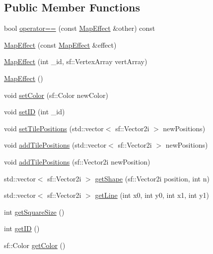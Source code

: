 \subsection*{Public Member Functions}
\begin{DoxyCompactItemize}
\item 
bool \mbox{\hyperlink{class_map_effect_a4782568b5d45629c080fdf183943ea29}{operator==}} (const \mbox{\hyperlink{class_map_effect}{Map\+Effect}} \&other) const
\item 
\mbox{\hyperlink{class_map_effect_aff543fedf91ca1798942f756c8388aa3}{Map\+Effect}} (const \mbox{\hyperlink{class_map_effect}{Map\+Effect}} \&effect)
\item 
\mbox{\hyperlink{class_map_effect_ac517bf5e557ac443b45a1dedb2b216ab}{Map\+Effect}} (int \+\_\+id, sf\+::\+Vertex\+Array vert\+Array)
\item 
\mbox{\hyperlink{class_map_effect_aa271c0e92d24c599620890409a7a0de6}{Map\+Effect}} ()
\item 
void \mbox{\hyperlink{class_map_effect_a099bb0a933606b5fb24e0eb91a9f78b6}{set\+Color}} (sf\+::\+Color new\+Color)
\item 
void \mbox{\hyperlink{class_map_effect_a7945a4888b4f7d3d14990beac98d6b46}{set\+ID}} (int \+\_\+id)
\item 
void \mbox{\hyperlink{class_map_effect_af79dd085aefbd1cdd92e9e9aa695592a}{set\+Tile\+Positions}} (std\+::vector$<$ sf\+::\+Vector2i $>$ new\+Positions)
\item 
void \mbox{\hyperlink{class_map_effect_a241e9bc24e9ded3426acedb2a36bc15b}{add\+Tile\+Positions}} (std\+::vector$<$ sf\+::\+Vector2i $>$ new\+Positions)
\item 
void \mbox{\hyperlink{class_map_effect_aa3ede6caaa085ad57f7cc5be0b143ca2}{add\+Tile\+Positions}} (sf\+::\+Vector2i new\+Position)
\item 
std\+::vector$<$ sf\+::\+Vector2i $>$ \mbox{\hyperlink{class_map_effect_a4557d94941b97471dce7ac47e30825c5}{get\+Shape}} (sf\+::\+Vector2i position, int n)
\item 
std\+::vector$<$ sf\+::\+Vector2i $>$ \mbox{\hyperlink{class_map_effect_a7aeebd5eef57c00feabca583a38c5361}{get\+Line}} (int x0, int y0, int x1, int y1)
\item 
int \mbox{\hyperlink{class_map_effect_aa96fb614319095fdc9003d85ea4647e2}{get\+Square\+Size}} ()
\item 
int \mbox{\hyperlink{class_map_effect_af05848201790b0038c5b61659b116706}{get\+ID}} ()
\item 
sf\+::\+Color \mbox{\hyperlink{class_map_effect_a8c3e266da325516b48983cf7cf238cf6}{get\+Color}} ()

\end{DoxyCompactItemize}
